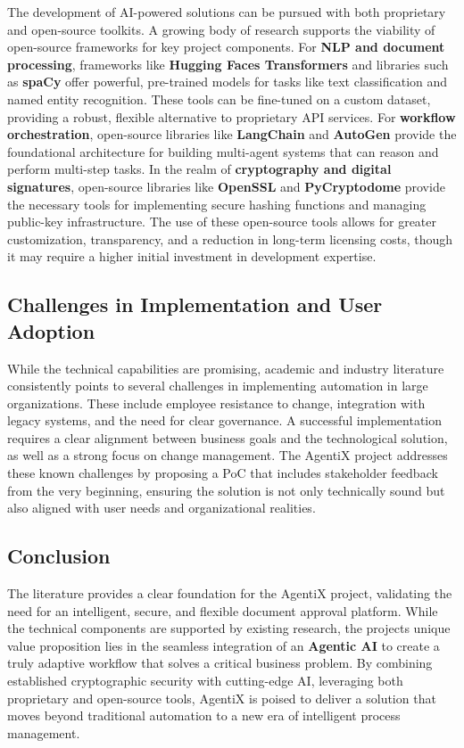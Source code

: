 \documentclass[12pt,oneside,openright,a4paper]{cpe-english-project}
\begin{document}
The development of AI-powered solutions can be pursued with both
proprietary and open-source toolkits. A growing body of research
supports the viability of open-source frameworks for key project
components. For \textbf{NLP and document processing}, frameworks like
\textbf{Hugging Face\textquotesingle s Transformers} and libraries such
as \textbf{spaCy} offer powerful, pre-trained models for tasks like text
classification and named entity recognition. These tools can be
fine-tuned on a custom dataset, providing a robust, flexible alternative
to proprietary API services. For \textbf{workflow orchestration},
open-source libraries like \textbf{LangChain} and \textbf{AutoGen}
provide the foundational architecture for building multi-agent systems
that can reason and perform multi-step tasks. In the realm of
\textbf{cryptography and digital signatures}, open-source libraries like
\textbf{OpenSSL} and \textbf{PyCryptodome} provide the necessary tools
for implementing secure hashing functions and managing public-key
infrastructure. The use of these open-source tools allows for greater
customization, transparency, and a reduction in long-term licensing
costs, though it may require a higher initial investment in development
expertise.

\subsection{Challenges in Implementation and User Adoption}

While the technical capabilities are promising, academic and industry
literature consistently points to several challenges in implementing
automation in large organizations. These include employee resistance to
change, integration with legacy systems, and the need for clear
governance. A successful implementation requires a clear alignment
between business goals and the technological solution, as well as a
strong focus on change management. The AgentiX project addresses these
known challenges by proposing a PoC that includes stakeholder feedback
from the very beginning, ensuring the solution is not only technically
sound but also aligned with user needs and organizational realities.

\vspace{1em}

\subsection{Conclusion}

The literature provides a clear foundation for the AgentiX project,
validating the need for an intelligent, secure, and flexible document
approval platform. While the technical components are supported by
existing research, the project\textquotesingle s unique value
proposition lies in the seamless integration of an \textbf{Agentic AI}
to create a truly adaptive workflow that solves a critical business
problem. By combining established cryptographic security with
cutting-edge AI, leveraging both proprietary and open-source tools,
AgentiX is poised to deliver a solution that moves beyond traditional
automation to a new era of intelligent process management.
\end{document}
